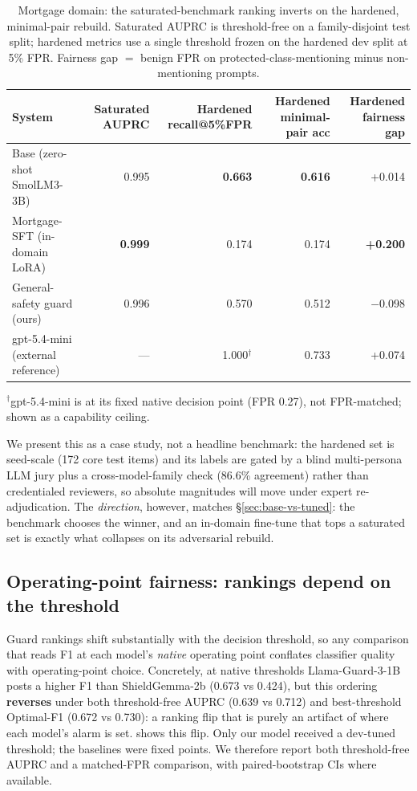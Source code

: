 \documentclass[sigconf,nonacm]{acmart}
\begin{document}
\begin{table}[t]
\centering
\small
\caption{Mortgage domain: the saturated-benchmark ranking inverts on the hardened, minimal-pair rebuild. Saturated AUPRC is threshold-free on a family-disjoint test split; hardened metrics use a single threshold frozen on the hardened dev split at 5\% FPR. Fairness gap $=$ benign FPR on protected-class-mentioning minus non-mentioning prompts.}
\label{tab:mortgage-casestudy}
\begin{tabular}{lrrrr}
\toprule
System & Saturated AUPRC & Hardened recall@5\%FPR & Hardened minimal-pair acc & Hardened fairness gap \\
\midrule
Base (zero-shot SmolLM3-3B) & 0.995 & \textbf{0.663} & \textbf{0.616} & +0.014 \\
Mortgage-SFT (in-domain LoRA) & \textbf{0.999} & 0.174 & 0.174 & \textbf{+0.200} \\
General-safety guard (ours) & 0.996 & 0.570 & 0.512 & $-0.098$ \\
gpt-5.4-mini (external reference) & --- & 1.000$^{\dagger}$ & 0.733 & +0.074 \\
\bottomrule
\end{tabular}

\vspace{2pt}
{\footnotesize $^{\dagger}$gpt-5.4-mini is at its fixed native decision point (FPR 0.27), not FPR-matched; shown as a capability ceiling.}
\end{table}

We present this as a case study, not a headline benchmark: the hardened set is seed-scale (172 core test items) and its labels are gated by a blind multi-persona LLM jury plus a cross-model-family check (86.6\% agreement) rather than credentialed reviewers, so absolute magnitudes will move under expert re-adjudication. The \emph{direction}, however, matches \S\ref{sec:base-vs-tuned}: the benchmark chooses the winner, and an in-domain fine-tune that tops a saturated set is exactly what collapses on its adversarial rebuild.

\subsection{Operating-point fairness: rankings depend on the threshold}
\label{sec:operating-point-fairness}

Guard rankings shift substantially with the decision threshold, so any comparison that reads F1 at each model's \emph{native} operating point conflates classifier quality with operating-point choice. Concretely, at native thresholds Llama-Guard-3-1B posts a higher F1 than ShieldGemma-2b (0.673 vs 0.424), but this ordering \textbf{reverses} under both threshold-free AUPRC (0.639 vs 0.712) and best-threshold Optimal-F1 (0.672 vs 0.730): a ranking flip that is purely an artifact of where each model's alarm is set.  shows this flip. Only our model received a dev-tuned threshold; the baselines were fixed points. We therefore report both threshold-free AUPRC and a matched-FPR comparison, with paired-bootstrap CIs where available.
\end{document}
